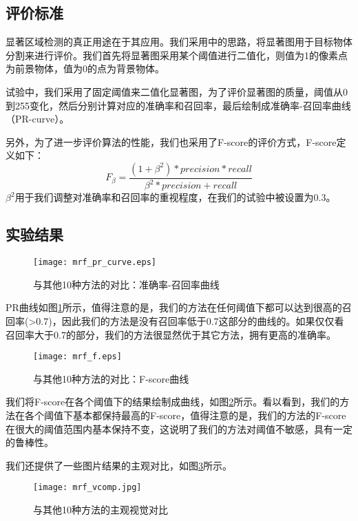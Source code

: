 \subsection{评价标准}
显著区域检测的真正用途在于其应用。我们采用\cite{achanta2009frequency}中的思路，将显著图用于目标物体分割来进行评价。我们首先将显著图采用某个阈值进行二值化，则值为1的像素点为前景物体，值为0的点为背景物体。

试验中，我们采用了固定阈值来二值化显著图，为了评价显著图的质量，阈值从0到255变化，然后分别计算对应的准确率和召回率，最后绘制成准确率-召回率曲线（PR-curve）。

另外，为了进一步评价算法的性能，我们也采用了F-score的评价方式，F-score定义如下：
\begin{equation}
F_{\beta} = \frac{(1+\beta^2)*precision*recall}{\beta^2*precision+recall}
\end{equation}
$\beta^2$用于我们调整对准确率和召回率的重视程度，在我们的试验中被设置为0.3。

\subsection{实验结果}
\begin{figure}
\centering
\texttt{[image: mrf\_pr\_curve.eps]}
\caption{与其他10种方法的对比：准确率-召回率曲线}
\label{fig:results1_pr}
\end{figure}
PR曲线如图\ref{fig:results1_pr}所示，值得注意的是，我们的方法在任何阈值下都可以达到很高的召回率(>0.7)，因此我们的方法是没有召回率低于0.7这部分的曲线的。如果仅仅看召回率大于0.7的部分，我们的方法很显然优于其它方法，拥有更高的准确率。

\begin{figure}
\centering
\texttt{[image: mrf\_f.eps]}
\caption{与其他10种方法的对比：F-score曲线}
\label{fig:results1_fscore}
\end{figure}
我们将F-score在各个阈值下的结果绘制成曲线，如图\ref{fig:results1_fscore}所示。看以看到，我们的方法在各个阈值下基本都保持最高的F-score，值得注意的是，我们的方法的F-score在很大的阈值范围内基本保持不变，这说明了我们的方法对阈值不敏感，具有一定的鲁棒性。

我们还提供了一些图片结果的主观对比，如图\ref{fig:vresult1}所示。
\begin{figure}[h]
\centering
\texttt{[image: mrf\_vcomp.jpg]}
\caption{与其他10种方法的主观视觉对比}\label{fig:vresult1}
\end{figure}